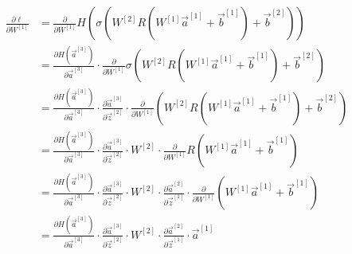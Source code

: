 \documentclass[12pt,titlepage]{article}
\begin{document}
\begin{align*}
  \frac{\partial \ell}{\partial W^{[1]}}
   & = \frac{\partial}{\partial W^{[1]}} H(\sigma(W^{[2]} R(W^{[1]} \vec{a}^{[1]} + \vec{b}^{[1]}) + \vec{b}^{[2]}))                                                                                                                                                                  \\
   & = \frac{\partial H(\vec{a}^{[3]})}{\partial \vec{a}^{[3]}} \cdot \frac{\partial}{\partial W^{[1]}} \sigma(W^{[2]} R(W^{[1]} \vec{a}^{[1]} + \vec{b}^{[1]}) + \vec{b}^{[2]})                                                                                                      \\
   & = \frac{\partial H(\vec{a}^{[3]})}{\partial \vec{a}^{[3]}} \cdot \frac{\partial \vec{a}^{[3]}}{\partial \vec{z}^{[2]}} \cdot \frac{\partial}{\partial W^{[1]}} (W^{[2]} R(W^{[1]} \vec{a}^{[1]} + \vec{b}^{[1]}) + \vec{b}^{[2]})                                                \\
   & = \frac{\partial H(\vec{a}^{[3]})}{\partial \vec{a}^{[3]}} \cdot \frac{\partial \vec{a}^{[3]}}{\partial \vec{z}^{[2]}} \cdot W^{[2]} \cdot \frac{\partial}{\partial W^{[1]}} R(W^{[1]} \vec{a}^{[1]} + \vec{b}^{[1]})                                                            \\
   & = \frac{\partial H(\vec{a}^{[3]})}{\partial \vec{a}^{[3]}} \cdot \frac{\partial \vec{a}^{[3]}}{\partial \vec{z}^{[2]}} \cdot W^{[2]} \cdot \frac{\partial \vec{a}^{[2]}}{\partial \vec{z}^{[1]}} \cdot \frac{\partial}{\partial W^{[1]}} (W^{[1]} \vec{a}^{[1]} + \vec{b}^{[1]}) \\
   & = \frac{\partial H(\vec{a}^{[3]})}{\partial \vec{a}^{[3]}} \cdot \frac{\partial \vec{a}^{[3]}}{\partial \vec{z}^{[2]}} \cdot W^{[2]} \cdot \frac{\partial \vec{a}^{[2]}}{\partial \vec{z}^{[1]}} \cdot \vec{a}^{[1]}
\end{align*}
\end{document}
